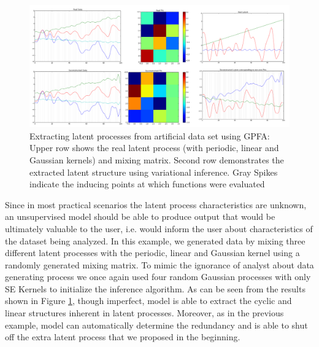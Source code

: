 {\begin{figure}
    \centering
    \includegraphics[scale=0.25]{thesis/images/SLFM_demo2.png}
    \caption{Extracting latent processes from artificial data set using GPFA: Upper row shows the real latent process (with periodic, linear and Gaussian kernels) and mixing matrix. Second row demonstrates the extracted latent structure using variational inference. Gray Spikes indicate the inducing points at which functions were evaluated}
    \label{fig:slfm_demo2}
\end{figure}

Since in most practical scenarios the latent process characteristics are unknown, an unsupervised model should be able to produce output that would be ultimately valuable to the user, i.e. would inform the user about characteristics of the dataset being analyzed. In this example, we generated data by mixing three different latent processes with the periodic, linear and Gaussian kernel using a randomly generated mixing matrix. To mimic the ignorance of analyst about data generating process we once again used four random Gaussian processes with only SE Kernels to initialize the inference algorithm. As can be seen from the results shown in Figure \ref{fig:slfm_demo2}, though imperfect, model is able to extract the cyclic and linear structures inherent in latent processes. Moreover, as in the previous example, model can automatically determine the redundancy and is able to shut off the extra latent process that we proposed in the beginning. 

}
